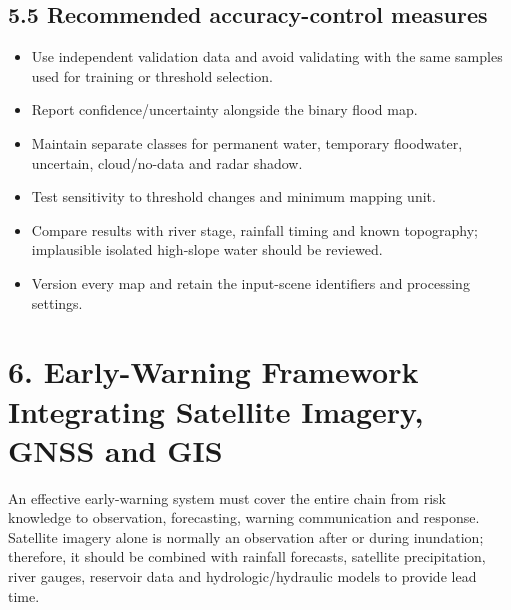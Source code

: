 \documentclass[11pt,a4paper]{article}
\begin{document}
\subsection{5.5 Recommended accuracy-control measures}\label{recommended-accuracy-control-measures}

\begin{itemize}
\item
  Use independent validation data and avoid validating with the same samples used for training or threshold selection.
\item
  Report confidence/uncertainty alongside the binary flood map.
\item
  Maintain separate classes for permanent water, temporary floodwater, uncertain, cloud/no-data and radar shadow.
\item
  Test sensitivity to threshold changes and minimum mapping unit.
\item
  Compare results with river stage, rainfall timing and known topography; implausible isolated high-slope water should be reviewed.
\item
  Version every map and retain the input-scene identifiers and processing settings.
\end{itemize}

\section{6. Early-Warning Framework Integrating Satellite Imagery, GNSS and GIS}\label{early-warning-framework-integrating-satellite-imagery-gnss-and-gis}

An effective early-warning system must cover the entire chain from risk knowledge to observation, forecasting, warning communication and response. Satellite imagery alone is normally an observation after or during inundation; therefore, it should be combined with rainfall forecasts, satellite precipitation, river gauges, reservoir data and hydrologic/hydraulic models to provide lead time.
\end{document}
